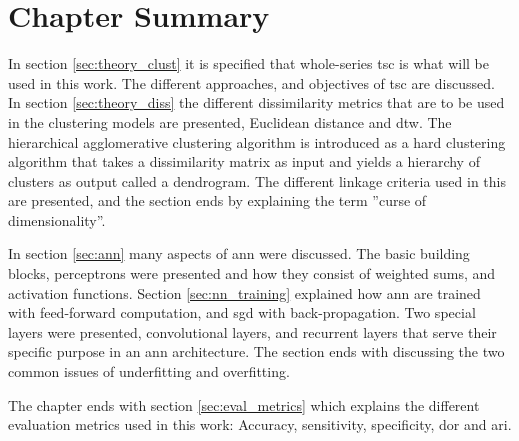 \section{Chapter Summary}

In section \ref{sec:theory_clust} it is specified that whole-series \acrshort{tsc} is what will be used in this work. The different approaches, and objectives of \acrshort{tsc} are discussed. In section \ref{sec:theory_diss} the different dissimilarity metrics that are to be used in the clustering models are presented, Euclidean distance and \acrshort{dtw}. The hierarchical agglomerative clustering algorithm is introduced as a hard clustering algorithm that takes a dissimilarity matrix as input and yields a hierarchy of clusters as output called a dendrogram. The different linkage criteria used in this are presented, and the section ends by explaining the term ''curse of dimensionality''. \bigskip

In section \ref{sec:ann} many aspects of \acrshort{ann} were discussed. The basic building blocks, perceptrons were presented and how they consist of weighted sums, and activation functions. Section \ref{sec:nn_training} explained how \acrshort{ann} are trained with feed-forward computation, and \acrshort{sgd} with back-propagation. Two special layers were presented, convolutional layers, and recurrent layers that serve their specific purpose in an \acrshort{ann} architecture. The section ends with discussing the two common issues of underfitting and overfitting. \bigskip
 
The chapter ends with section \ref{sec:eval_metrics} which explains the different evaluation metrics used in this work: Accuracy, sensitivity, specificity, \acrshort{dor} and \acrshort{ari}.
